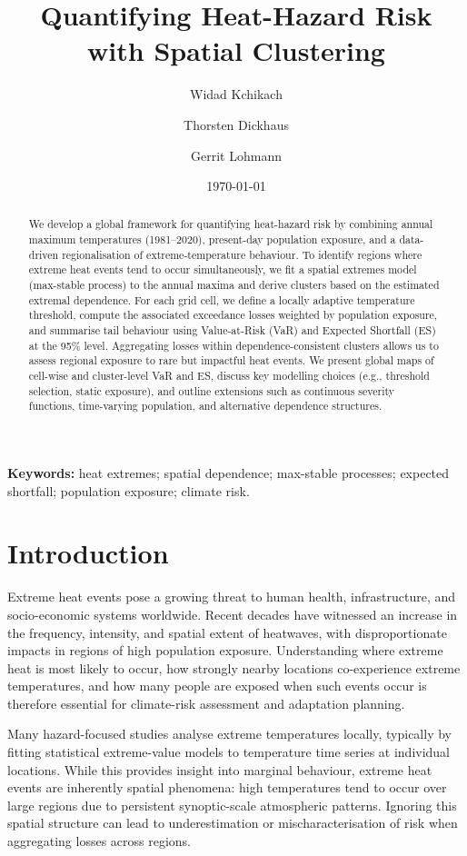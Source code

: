 \documentclass[12pt]{article}
\title{Quantifying Heat-Hazard Risk with Spatial Clustering }
\author[1,2]{Widad Kchikach}
\author[2]{Thorsten Dickhaus}
\author[1,3]{Gerrit Lohmann}
\affil[1]{Alfred Wegener Institute Helmholtz Centre for Polar and Marine Research, Bremerhaven, Germany}
\affil[2]{Institute for Statistics, University of Bremen, Bremen, Germany}
\affil[3]{Department of Environmental Physics, University of Bremen, Bremen, Germany}
\date{\today}
\begin{document}
\maketitle



\begin{abstract}
We develop a global framework for quantifying heat-hazard risk by combining annual
maximum temperatures (1981--2020), present-day population exposure, and a
data-driven regionalisation of extreme-temperature behaviour. To identify regions where
extreme heat events tend to occur simultaneously, we fit a spatial extremes model
(max-stable process) to the annual maxima and derive clusters based on the estimated
extremal dependence. For each grid cell, we define a locally adaptive temperature
threshold, compute the associated exceedance losses weighted by population exposure,
and summarise tail behaviour using Value-at-Risk (VaR) and Expected Shortfall (ES) at
the 95\% level. Aggregating losses within dependence-consistent clusters allows us to
assess regional exposure to rare but impactful heat events. We present global maps of
cell-wise and cluster-level VaR and ES, discuss key modelling choices (e.g., threshold
selection, static exposure), and outline extensions such as continuous severity
functions, time-varying population, and alternative dependence structures.

\end{abstract}

\noindent\textbf{Keywords:} heat extremes; spatial dependence; max-stable processes; expected shortfall; population exposure; climate risk.



\section{Introduction}

Extreme heat events pose a growing threat to human health, infrastructure, and
socio-economic systems worldwide. Recent decades have witnessed an increase in the
frequency, intensity, and spatial extent of heatwaves, with disproportionate impacts in
regions of high population exposure. Understanding where extreme heat is most likely to
occur, how strongly nearby locations co-experience extreme temperatures, and how many
people are exposed when such events occur is therefore essential for climate-risk
assessment and adaptation planning.

Many hazard-focused studies analyse extreme temperatures locally, typically by fitting
statistical extreme-value models to temperature time series at individual locations.
While this provides insight into marginal behaviour, extreme heat events are inherently
spatial phenomena: high temperatures tend to occur over large regions due to persistent
synoptic-scale atmospheric patterns. Ignoring this spatial structure can lead to
underestimation or mischaracterisation of risk when aggregating losses across regions.
\end{document}
